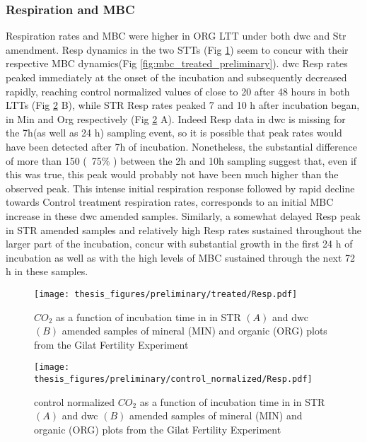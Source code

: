 \documentclass[12pt]{report}
\begin{document}
		\subsubsection{Respiration and MBC}
		Respiration rates and MBC were higher in ORG LTT under both \gls{dwc} and Str amendment.
		Resp dynamics in the two STTs (Fig \ref{fig:resp_treated_preliminary}) seem to concur with their respective MBC dynamics(Fig \ref{fig:mbc_treated_preliminary}). \gls{dwc} Resp rates peaked immediately at the onset of the incubation and subsequently decreased rapidly, reaching control normalized values of close to 20 \respunit after 48 hours in both LTTs (Fig \ref{fig:nor_resp_treated_preliminary} B), while STR Resp rates peaked 7 and 10 h after incubation began, in Min and Org respectively (Fig \ref{fig:nor_resp_treated_preliminary} A). Indeed Resp data in \gls{dwc} is missing for the 7h(as well as 24 h) sampling event, so it is possible that peak rates would have been detected after 7h of incubation. Nonetheless, the substantial difference of more than 150 \genericunit (~75$\%$ ) between the 2h and 10h sampling suggest that, even if this was true, this peak would probably not have been much higher than the observed peak. This intense initial respiration response followed by rapid decline towards Control treatment respiration rates, corresponds  to an initial MBC increase in these \gls{dwc} amended samples. Similarly, a somewhat delayed Resp peak in STR amended samples and relatively high Resp rates sustained throughout the larger part of the incubation, concur with substantial growth in the first 24 h of incubation as well as with the high levels of MBC sustained through the next 72 h in these samples.\\
		\begin{figure}[H]
			\centering
			\texttt{[image: thesis\_figures/preliminary/treated/Resp.pdf]}
			\caption{$CO_2$ as a function of incubation time in in STR $\left(A\right)$ and \gls{dwc} $\left(B\right)$ amended samples of mineral (MIN) and organic (ORG) plots from the Gilat Fertility Experiment}
			\label{fig:resp_treated_preliminary}
		\end{figure}
		
		\begin{figure}[H]
			\centering
			\texttt{[image: thesis\_figures/preliminary/control\_normalized/Resp.pdf]}
			\caption{control normalized $CO_2$  as a function of incubation time in in STR $\left(A\right)$ and \gls{dwc} $\left(B\right)$ amended samples of mineral (MIN) and organic (ORG) plots from the Gilat Fertility Experiment}
			\label{fig:nor_resp_treated_preliminary}
		\end{figure}
		
\end{document}

